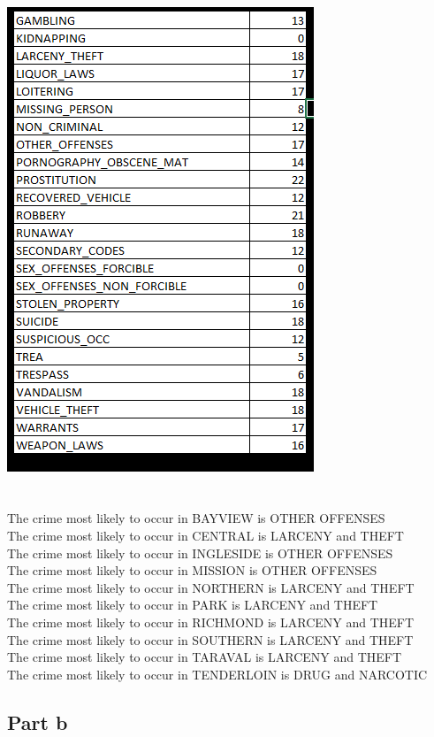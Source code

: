 \documentclass[paper=a4, fontsize=11pt]{scrartcl} %
\numberwithin{equation}{section} %
\numberwithin{figure}{section} %
\numberwithin{table}{section} %
\begin{document}
	\\
	\includegraphics{crimes_hours_2}
	\\\\\\
	The crime most likely to occur in BAYVIEW is OTHER OFFENSES\\
	The crime most likely to occur in CENTRAL is LARCENY and THEFT\\
	The crime most likely to occur in INGLESIDE is OTHER OFFENSES\\
	The crime most likely to occur in MISSION is OTHER OFFENSES\\
	The crime most likely to occur in NORTHERN is LARCENY and THEFT\\
	The crime most likely to occur in PARK is LARCENY and THEFT\\
	The crime most likely to occur in RICHMOND is LARCENY and THEFT\\
	The crime most likely to occur in SOUTHERN is LARCENY and THEFT\\
	The crime most likely to occur in TARAVAL is LARCENY and THEFT\\
	The crime most likely to occur in TENDERLOIN is DRUG and NARCOTIC
	\subsection{Part b}
	
\end{document}
